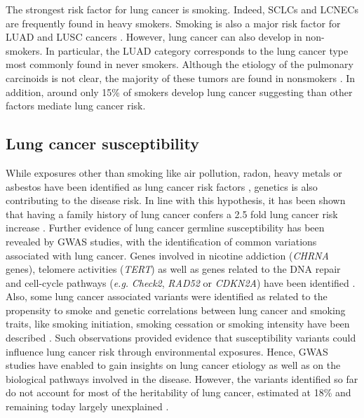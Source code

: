 The strongest risk factor for lung cancer is smoking. Indeed, \gls{SCLC}s and \gls{LCNEC}s are frequently found in heavy smokers. Smoking is also a major risk factor for \gls{LUAD} and \gls{LUSC} cancers \cite{Campbell2016}. However, lung cancer can also develop in non-smokers. In particular, the \gls{LUAD} category corresponds to the lung cancer type most commonly found in never smokers. Although the etiology of the pulmonary carcinoids is not clear, the majority of these tumors are found in nonsmokers \cite{Derks2018}. %
In addition, around only 15\% of smokers develop lung cancer suggesting than other factors mediate lung cancer risk. 

\subsection{Lung cancer susceptibility}
While exposures other than smoking like air pollution, radon, heavy metals or asbestos have been identified as lung cancer risk factors \cite{DeAlencar2020}, genetics is also contributing to the disease risk. In line with this hypothesis, it has been shown that having a family history of lung cancer confers a 2.5 fold lung cancer risk increase \cite{Amos1999}. Further evidence of lung cancer germline susceptibility has been revealed by \gls{GWAS} studies, with the identification of common variations associated with lung cancer. Genes involved in nicotine addiction (\textit{CHRNA} genes), telomere activities (\textit{TERT}) as well as genes related to the DNA repair and cell-cycle pathways (\textit{e.g.} \textit{Check2}, \textit{RAD52} or \textit{CDKN2A}) have been identified \cite{Bosse2018}. 
Also, some lung cancer associated variants were identified as related to the propensity to smoke \cite{Thorgeirsson2008,McKay2017} and genetic correlations between lung cancer and smoking traits, like smoking initiation, smoking cessation or smoking intensity have been described \cite{McKay2017}. Such observations provided evidence that susceptibility variants could influence lung cancer risk through environmental exposures.
Hence, \gls{GWAS} studies have enabled to gain insights on lung cancer etiology as well as on the biological pathways involved in the disease. However, the variants identified so far do not account for most of the heritability of lung cancer, estimated at 18\% and remaining today largely unexplained \cite{McKay2017}.  

